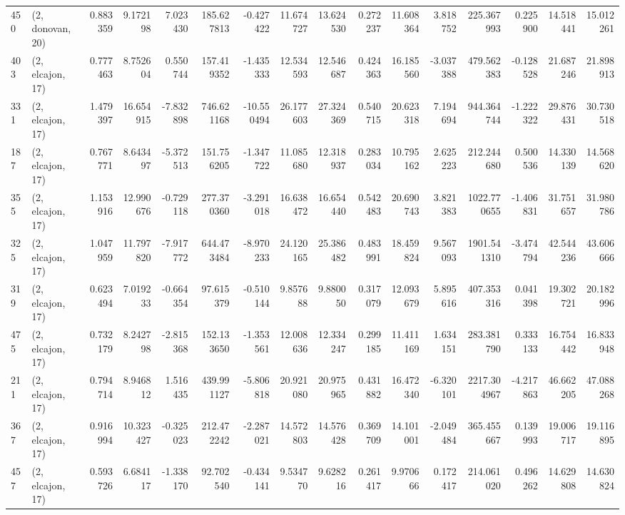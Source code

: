 \begin{tabular}{llrrrrrrrrrrrrrr}
450 &  (2, donovan, 20) &   0.883359 &   9.172198 &   7.023430 &   185.627813 &  -0.427422 &  11.674727 &  13.624530 &  0.272237 &  11.608364 &   3.818752 &   225.367993 &   0.225900 &  14.518441 &  15.012261 \\
403 &  (2, elcajon, 17) &   0.777463 &   8.752604 &   0.550744 &   157.419352 &  -1.435333 &  12.534593 &  12.546687 &  0.424363 &  16.185560 &  -3.037388 &   479.562383 &  -0.128528 &  21.687246 &  21.898913 \\
331 &  (2, elcajon, 17) &   1.479397 &  16.654915 &  -7.832898 &   746.621168 & -10.550494 &  26.177603 &  27.324369 &  0.540715 &  20.623318 &   7.194694 &   944.364744 &  -1.222322 &  29.876431 &  30.730518 \\
187 &  (2, elcajon, 17) &   0.767771 &   8.643497 &  -5.372513 &   151.756205 &  -1.347722 &  11.085680 &  12.318937 &  0.283034 &  10.795162 &   2.625223 &   212.244680 &   0.500536 &  14.330139 &  14.568620 \\
355 &  (2, elcajon, 17) &   1.153916 &  12.990676 &  -0.729118 &   277.370360 &  -3.291018 &  16.638472 &  16.654440 &  0.542483 &  20.690743 &   3.821383 &  1022.770655 &  -1.406831 &  31.751657 &  31.980786 \\
325 &  (2, elcajon, 17) &   1.047959 &  11.797820 &  -7.917772 &   644.473484 &  -8.970233 &  24.120165 &  25.386482 &  0.483991 &  18.459824 &   9.567093 &  1901.541310 &  -3.474794 &  42.544236 &  43.606666 \\
319 &  (2, elcajon, 17) &   0.623494 &   7.019233 &  -0.664354 &    97.615379 &  -0.510144 &   9.857688 &   9.880050 &  0.317079 &  12.093679 &   5.895616 &   407.353316 &   0.041398 &  19.302721 &  20.182996 \\
475 &  (2, elcajon, 17) &   0.732179 &   8.242798 &  -2.815368 &   152.133650 &  -1.353561 &  12.008636 &  12.334247 &  0.299185 &  11.411169 &   1.634151 &   283.381790 &   0.333133 &  16.754442 &  16.833948 \\
211 &  (2, elcajon, 17) &   0.794714 &   8.946812 &   1.516435 &   439.991127 &  -5.806818 &  20.921080 &  20.975965 &  0.431882 &  16.472340 &  -6.320101 &  2217.304967 &  -4.217863 &  46.662205 &  47.088268 \\
367 &  (2, elcajon, 17) &   0.916994 &  10.323427 &  -0.325023 &   212.472242 &  -2.287021 &  14.572803 &  14.576428 &  0.369709 &  14.101001 &  -2.049484 &   365.455667 &   0.139993 &  19.006717 &  19.116895 \\
457 &  (2, elcajon, 17) &   0.593726 &   6.684117 &  -1.338170 &    92.702540 &  -0.434141 &   9.534770 &   9.628216 &  0.261417 &   9.970666 &   0.172417 &   214.061020 &   0.496262 &  14.629808 &  14.630824 \\

\end{tabular}
